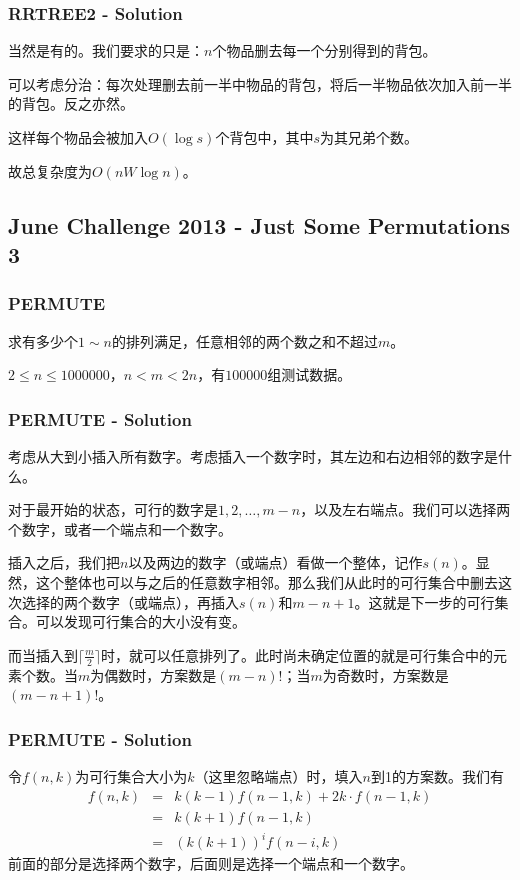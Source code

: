 \documentclass[11pt,dvipsnames,table]{beamer}
\begin{document}
{
	\begin{frame}
		\frametitle{RRTREE2 - Solution}
		当然是有的。我们要求的只是：$n$个物品删去每一个分别得到的背包。 \pause
		
		可以考虑分治：每次处理删去前一半中物品的背包，将后一半物品依次加入前一半的背包。反之亦然。
		
		这样每个物品会被加入$O(\log{s})$个背包中，其中$s$为其兄弟个数。
		
		故总复杂度为$O(nW\log n)$。
	\end{frame}
	
	\subsection{June Challenge 2013 - Just Some Permutations 3}
	\begin{frame} %
		\frametitle{PERMUTE}
		求有多少个$1\sim n$的排列满足，任意相邻的两个数之和不超过$m$。
		
		$2\leq n\leq1000000$，$n<m<2n$，有$100000$组测试数据。
	\end{frame}
	\begin{frame}
		\frametitle{PERMUTE - Solution}
		考虑从大到小插入所有数字。考虑插入一个数字时，其左边和右边相邻的数字是什么。
		
		对于最开始的状态，可行的数字是$1,2,\ldots,m-n$，以及左右端点。我们可以选择两个数字，或者一个端点和一个数字。 \pause
		
		插入之后，我们把$n$以及两边的数字（或端点）看做一个整体，记作$s(n)$。显然，这个整体也可以与之后的任意数字相邻。那么我们从此时的可行集合中删去这次选择的两个数字（或端点），再插入$s(n)$和$m-n+1$。这就是下一步的可行集合。可以发现可行集合的大小没有变。 \pause
		
		而当插入到$\lceil\frac{m}{2}\rceil$时，就可以任意排列了。此时尚未确定位置的就是可行集合中的元素个数。当$m$为偶数时，方案数是$(m-n)!$；当$m$为奇数时，方案数是$(m-n+1)!$。
	\end{frame}
	\begin{frame}
		\frametitle{PERMUTE - Solution}
		令$f(n,k)$为可行集合大小为$k$（这里忽略端点）时，填入$n$到1的方案数。我们有
		\begin{eqnarray*}
			f(n,k) & = & k(k-1)f(n-1,k)+2k\cdot f(n-1,k) \\
			 & = & k(k+1)f(n-1,k) \\
			 & = & (k(k+1))^if(n-i,k)
		\end{eqnarray*}
		前面的部分是选择两个数字，后面则是选择一个端点和一个数字。 \pause
		

\end{frame}}
\end{document}

